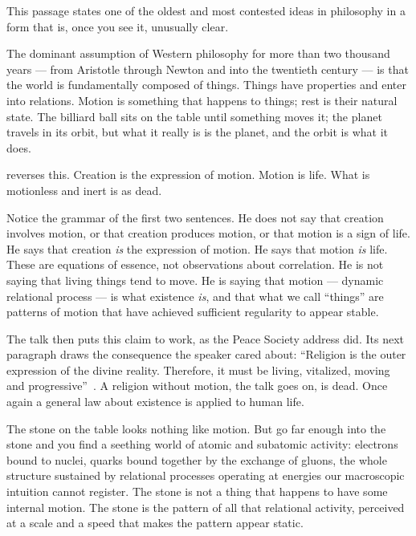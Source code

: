 This passage states one of the oldest and most contested ideas in
philosophy in a form that is, once you see it, unusually clear.

The dominant assumption of Western philosophy for more than two thousand
years --- from Aristotle through Newton and into the twentieth century ---
is that the world is fundamentally composed of things.
Things have properties and enter into relations.
Motion is something that happens to things; rest is their natural state.
The billiard ball sits on the table until something moves it; the planet
travels in its orbit, but what it really is is the planet, and the orbit
is what it does.

\AbdulBaha reverses this.
Creation is the expression of motion.
Motion is life.
What is motionless and inert is as dead.

Notice the grammar of the first two sentences.
He does not say that creation involves motion, or that creation produces
motion, or that motion is a sign of life.
He says that creation \emph{is} the expression of motion.
He says that motion \emph{is} life.
These are equations of essence, not observations about correlation.
He is not saying that living things tend to move.
He is saying that motion --- dynamic relational process --- is what existence
\emph{is}, and that what we call ``things'' are patterns of motion that have
achieved sufficient regularity to appear stable.

The talk then puts this claim to work, as the Peace Society address did.
Its next paragraph draws the consequence the speaker cared about: ``Religion
is the outer expression of the divine reality. Therefore, it must be living,
vitalized, moving and progressive''~\citep[Talk~52]{PUP}.
A religion without motion, the talk goes on, is dead.
Once again a general law about existence is applied to human life.

The stone on the table looks nothing like motion.
But go far enough into the stone and you find a seething world of atomic
and subatomic activity: electrons bound to nuclei, quarks bound together
by the exchange of gluons, the whole structure sustained by relational
processes operating at energies our macroscopic intuition cannot register.
The stone is not a thing that happens to have some internal motion.
The stone is the pattern of all that relational activity, perceived
at a scale and a speed that makes the pattern appear static.

